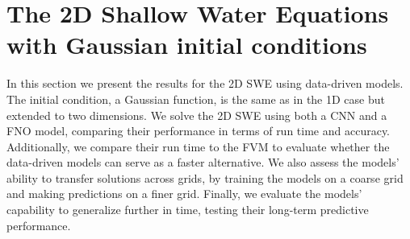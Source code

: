 \section{The 2D Shallow Water Equations with Gaussian initial conditions}\label{sec:data-driven-results-2D}
In this section we present the results for the 2D SWE using data-driven models. 
The initial condition, a Gaussian function, is the same as in the 1D case but extended to two dimensions.
We solve the 2D SWE using both a CNN and a FNO model, comparing their performance in terms of run time and accuracy.
Additionally, we compare their run time to the FVM to evaluate whether the data-driven models can serve as a faster alternative.
We also assess the models' ability to transfer solutions across grids, by training the models on a coarse grid and making predictions on a finer grid.
Finally, we evaluate the models' capability to generalize further in time, testing their long-term predictive performance.

